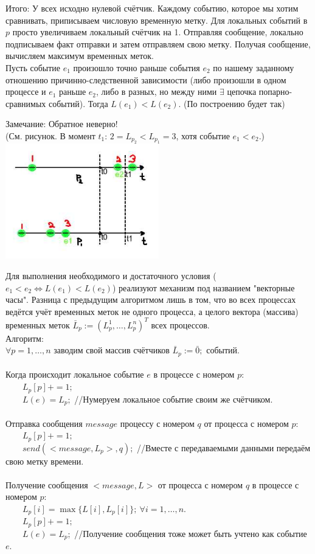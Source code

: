 Итого: У всех исходно нулевой счётчик. Каждому событию, которое мы хотим сравнивать, приписываем числовую временную метку. Для локальных событий в $p$ просто увеличиваем локальный счётчик на 1. Отправляя сообщение, локально подписываем факт отправки и затем отправляем свою метку. Получая сообщение, вычисляем максимум временных меток.\\

Пусть событие $e_1$ произошло точно раньше события $e_2$ по нашему заданному отношению причинно-следственной зависимости (либо произошли в одном процессе и $e_1$ раньше $e_2$, либо в разных, но между ними $\exists$ цепочка попарно-сравнимых событий).
Тогда $L(e_1) < L(e_2)$. (По построению будет так)

Замечание: Обратное неверно! \\
(См. рисунок. В момент $t_1$: $2 = L_{p_2} < L_{p_1} = 3$, хотя событие $e_1 < e_2$.)\\
\includegraphics[width=0.5\textwidth]{20/Comparison_for_labels.jpg}

Для выполнения необходимого и достаточного условия ($e_1 < e_2 \Leftrightarrow L(e_1) < L(e_2)$) реализуют механизм под названием "векторные часы". Разница с предыдущим алгоритмом лишь в том, что во всех процессах ведётся учёт временных меток не одного процесса, а целого вектора (массива) временных меток $\bar{L}_p := (L_p^1, \ldots, L_p^n)^T$ всех процессов.\\
Алгоритм:\\
$\forall p = 1, \ldots, n$ заводим свой массив счётчиков $\bar{L}_p := \bar{0};$ событий.\\ \\
Когда происходит локальное событие $e$ в процессе с номером $p$:\\
\ \ \ \ $L_p[p] += 1;$\\
\ \ \ \ $L(e) = L_p;$ //Нумеруем локальное событие своим же счётчиком. \\ \\
Отправка сообщения $message$ процессу с номером $q$ от процесса с номером $p$:\\
\ \ \ \ $L_p[p] += 1;$\\
\ \ \ \ $send(<message, L_p>, q);$ //Вместе с передаваемыми данными передаём свою метку времени.\\ \\
Получение сообщения $<message, L>$ от процесса с номером $q$ в  процессе с номером $p$:\\
\ \ \ \ $L_p[i] = \max\{L[i],L_p[i]\};\ \forall i = 1, \ldots, n.$\\
\ \ \ \ $L_p[p] += 1;$\\
\ \ \ \ $L(e) = L_p;$ //Получение сообщения тоже может быть учтено как событие $e$.\\

